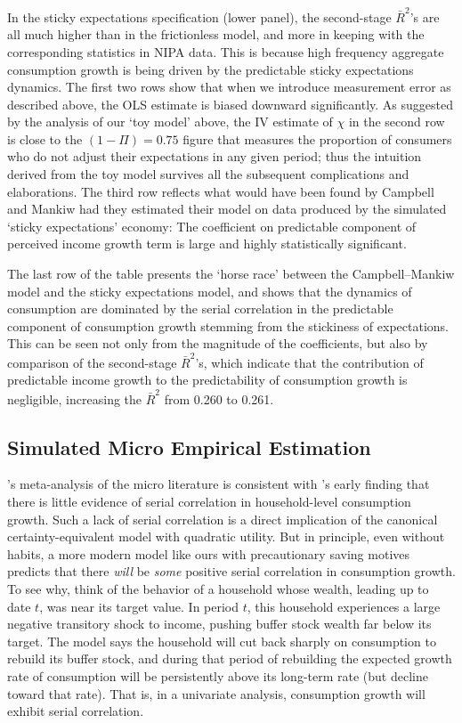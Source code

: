 \documentclass[titlepage]{article}
\begin{document}
In the sticky expectations specification (lower panel), the second-stage $\bar{R}^{2}$'s are all much higher than in the frictionless model, and more in keeping with the corresponding statistics in NIPA data. This is because high frequency aggregate consumption growth is being driven by the predictable sticky expectations dynamics. The first two rows show that when we introduce measurement error as described above, the OLS estimate is biased downward significantly. As suggested by the analysis of our `toy model' above, the IV estimate of $\chi$ in the second row is close to the $(1-\Pi)=0.75$ figure that measures the proportion of consumers who do not adjust their expectations in any given period; thus the intuition derived from the toy model survives all the subsequent complications and elaborations. The third row reflects what would have been found by Campbell and Mankiw had they estimated their model on data produced by the simulated `sticky expectations' economy:  The coefficient on predictable component of perceived income growth term is large and highly statistically significant.

The last row of the table presents the `horse race' between the Campbell--Mankiw model and the sticky expectations model, and shows that the dynamics of consumption are dominated by the serial correlation in the predictable component of consumption growth stemming from the stickiness of expectations.  This can be seen not only from the magnitude of the coefficients, but also by comparison of the second-stage $\bar{R}^{2}$'s, which indicate that the contribution of predictable income growth to the predictability of consumption growth is negligible, increasing the $\bar{R}^2$ from 0.260 to 0.261.

\subsection{Simulated Micro Empirical Estimation} \label{subsec:simMicro}

\cite{hrsHabit}'s meta-analysis of the micro literature is consistent with \cite{dynanHabits}'s early finding that there is little evidence of serial correlation in household-level consumption growth.  Such a lack of serial correlation is a direct implication of the canonical \cite{hallRandomWalk} certainty-equivalent model with quadratic utility.  But in principle, even without habits, a more modern model like ours with precautionary saving motives predicts that there {\it will} be {\it some} positive serial correlation in consumption growth.  To see why, think of the behavior of a household whose wealth, leading up to date $t$, was near its target value.
In period $t$, this household experiences a large negative transitory shock to income, pushing buffer stock wealth far below its target.  The model says the household will cut back sharply on consumption to rebuild its buffer stock, and during that period of rebuilding the expected growth rate of consumption will be persistently above its long-term rate (but decline toward that rate).  That is, in a univariate analysis, consumption growth will exhibit serial correlation.
\end{document}

